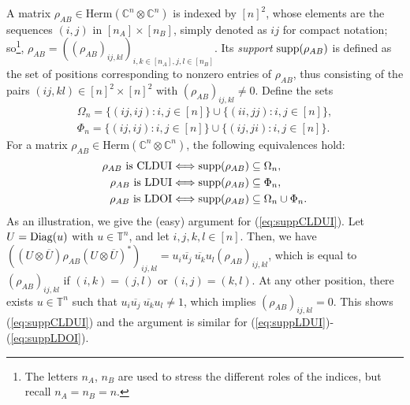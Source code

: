 \documentclass[11pt]{article}
\newcommand{\C}{\ensuremath{\mathbb{C}}} %
\newcommand{\T}{\ensuremath{\mathbb{T}}} %
\newcommand{\Herm}{\mathrm{Herm}}
\newcommand{\Cnn}{\C^n\ot \C^n}
\newcommand{\Diag}{\text{\rm Diag}}
\newcommand{\ot}{\otimes}
\newcommand{\supp}{\text{\rm supp}}
\newcommand{\ovU}{\overline U}
\theoremstyle{plain}
\begin{document}
\smallskip
A matrix $\rho_{AB}\in\Herm(\Cnn)$  is indexed by $[n]^2$, whose elements are  the sequences $(i,j)$ in $[n_A]\times [n_B]$, simply denoted as $ij$ for compact notation; so\footnote{The letters $n_A$, $n_B$ are used to stress the different roles of the indices, but recall   $n_A=n_B=n$.}, $\rho_{AB}=((\rho_{AB})_{ij,kl})_{i,k \in [n_A], j,l\in [n_B]}$. Its {\em support} $\supp(\rho_{AB})$    is defined as the set of positions corresponding to nonzero entries of $\rho_{AB}$, thus consisting of the pairs $(ij, kl)\in [n]^2\times [n]^2$ with $(\rho_{AB})_{ij,kl}\ne 0$.
Define the sets
\begin{align*}
\Omega_n=\{ (ij,ij): i, j\in [n]\}\cup \{(ii,jj): i,j\in [n]\},\\
\Phi_n=\{(ij,ij): i, j\in [n]\}\cup \{(ij,ji): i,j\in [n]\}.
\end{align*}
 For a matrix $\rho_{AB}\in \Herm(\Cnn)$, the following  equivalences hold:
\begin{align}
\rho_{AB} \text{ is CLDUI} &\Longleftrightarrow \supp(\rho_{AB})\subseteq
 \Omega_n,
 \label{eq:suppCLDUI}\\
\rho_{AB} \text{ is LDUI}  &\Longleftrightarrow \supp(\rho_{AB})\subseteq \Phi_n,
\label{eq:suppLDUI}\\
\rho_{AB} \text{ is LDOI}  &\Longleftrightarrow \supp(\rho_{AB})\subseteq
\Omega_n\cup\Phi_n.\label{eq:suppLDOI}
\end{align}
As an illustration,  we  give the (easy) argument for (\ref{eq:suppCLDUI}). Let $U=\Diag(u)$ with $u\in\T^n$, and let $i,j,k,l\in [n]$.  Then, we have
$((U\ot\ovU) \rho_{AB} (U\ot \ovU)^*)_{ij,kl}= u_i\overline{u_j}\ \overline {u_k}u_l (\rho_{AB})_{ij,kl}$, which is equal to $(\rho_{AB})_{ij,kl}$  if $(i,k)=(j,l)$ or $(i,j)=(k,l)$. At any other position, there exists $u\in\T^n$ such that $u_i\overline{u_j}\ \overline {u_k}u_l \ne 1$, which implies $(\rho_{AB})_{ij,kl}=0$.
This shows (\ref{eq:suppCLDUI}) and the argument is similar for (\ref{eq:suppLDUI})-(\ref{eq:suppLDOI}).
\end{document}
